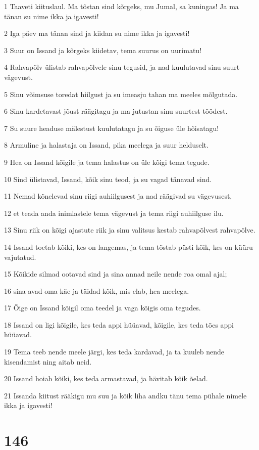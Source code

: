 \par 1 Taaveti kiituslaul. Ma tõstan sind kõrgeks, mu Jumal, sa kuningas! Ja ma tänan su nime ikka ja igavesti!
\par 2 Iga päev ma tänan sind ja kiidan su nime ikka ja igavesti!
\par 3 Suur on Issand ja kõrgeks kiidetav, tema suurus on uurimatu!
\par 4 Rahvapõlv ülistab rahvapõlvele sinu tegusid, ja nad kuulutavad sinu suurt vägevust.
\par 5 Sinu võimsuse toredat hiilgust ja su imeasju tahan ma meeles mõlgutada.
\par 6 Sinu kardetavast jõust räägitagu ja ma jutustan sinu suurtest töödest.
\par 7 Su suure headuse mälestust kuulutatagu ja su õiguse üle hõisatagu!
\par 8 Armuline ja halastaja on Issand, pika meelega ja suur helduselt.
\par 9 Hea on Issand kõigile ja tema halastus on üle kõigi tema tegude.
\par 10 Sind ülistavad, Issand, kõik sinu teod, ja su vagad tänavad sind.
\par 11 Nemad kõnelevad sinu riigi auhiilgusest ja nad räägivad su vägevusest,
\par 12 et teada anda inimlastele tema vägevust ja tema riigi auhiilguse ilu.
\par 13 Sinu riik on kõigi ajastute riik ja sinu valitsus kestab rahvapõlvest rahvapõlve.
\par 14 Issand toetab kõiki, kes on langemas, ja tema tõstab püsti kõik, kes on küüru vajutatud.
\par 15 Kõikide silmad ootavad sind ja sina annad neile nende roa omal ajal;
\par 16 sina avad oma käe ja täidad kõik, mis elab, hea meelega.
\par 17 Õige on Issand kõigil oma teedel ja vaga kõigis oma tegudes.
\par 18 Issand on ligi kõigile, kes teda appi hüüavad, kõigile, kes teda tões appi hüüavad.
\par 19 Tema teeb nende meele järgi, kes teda kardavad, ja ta kuuleb nende kisendamist ning aitab neid.
\par 20 Issand hoiab kõiki, kes teda armastavad, ja hävitab kõik õelad.
\par 21 Issanda kiitust rääkigu mu suu ja kõik liha andku tänu tema pühale nimele ikka ja igavesti!

\chapter{146}

